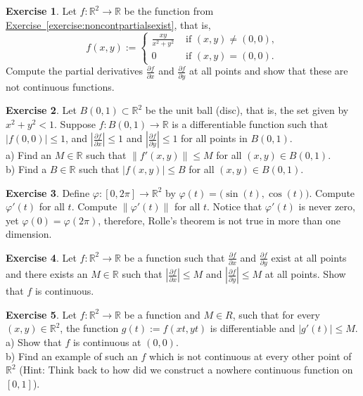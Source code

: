 \documentclass[12pt]{book}
\newcommand{\snorm}[1]{\lVert {#1} \rVert}
\newcommand{\abs}[1]{\left\lvert {#1} \right\rvert}
\newcommand{\R}{{\mathbb{R}}}
\theoremstyle{plain}
\theoremstyle{remark}
\theoremstyle{definition}
\theoremstyle{exercise}
\newtheorem{exercise}{Exercise}[section]
\theoremstyle{example}
\newcommand{\exerciseref}[1]{\hyperref[#1]{Exercise~\ref*{#1}}}
\begin{document}
\begin{exercise}
Let $f \colon \R^2 \to \R$ be the function from
\exerciseref{exercise:noncontpartialsexist}, that is,
\begin{equation*}
f(x,y)
:=
\begin{cases}
\frac{xy}{x^2+y^2} & \text{ if $(x,y) \not= (0,0)$}, \\
0 & \text{ if $(x,y) = (0,0)$}.
\end{cases}
\end{equation*}
Compute the partial derivatives 
$\frac{\partial f}{\partial x}$ and
$\frac{\partial f}{\partial y}$ at all points and show that these are not
continuous functions.
\end{exercise}

\begin{exercise}
Let $B(0,1) \subset \R^2$ be the unit ball (disc), that is, the set given by
$x^2 + y^2 < 1$.
Suppose $f \colon B(0,1) \to \R$ is a differentiable function
such that $\abs{f(0,0)} \leq 1$,
and 
$\abs{\frac{\partial f}{\partial x}} \leq 1$ and
$\abs{\frac{\partial f}{\partial y}} \leq 1$ for all
points in $B(0,1)$.\\
a) Find an $M \in \R$ such that $\snorm{f'(x,y)} \leq M$
for all $(x,y) \in
B(0,1)$.\\
b) Find a $B \in \R$ such that
$\abs{f(x,y)} \leq B$
for all $(x,y) \in
B(0,1)$.
\end{exercise}

\begin{exercise}
Define $\varphi \colon [0,2\pi] \to \R^2$ by $\varphi(t) =
\bigl(\sin(t),\cos(t)\bigr)$.  Compute $\varphi'(t)$ for all $t$.  Compute
$\snorm{\varphi'(t)}$ for all $t$.  Notice that $\varphi'(t)$ is never zero,
yet $\varphi(0) = \varphi(2\pi)$, therefore, Rolle's theorem is not true
in more than one dimension.
\end{exercise}

\begin{exercise}
Let $f \colon \R^2 \to \R$ be a function such that
$\frac{\partial f}{\partial x}$ and
$\frac{\partial f}{\partial y}$ exist at all points and there exists an $M
\in \R$
such that 
$\abs{\frac{\partial f}{\partial x}} \leq M$ and
$\abs{\frac{\partial f}{\partial y}} \leq M$ at all points.  Show that $f$
is continuous.
\end{exercise}

\begin{exercise}
Let $f \colon \R^2 \to \R$ be a function and
$M \in R$, such that
for every $(x,y) \in \R^2$, the function $g(t) := f(xt,yt)$ is
differentiable
and $\abs{g'(t)} \leq M$. \\
a) Show that $f$ is continuous at $(0,0)$.\\
b) Find an example of such an $f$ which is not continuous at every other point of
$\R^2$ (Hint: Think back to how did we construct a nowhere continuous function on $[0,1]$).
\end{exercise}
\end{document}
